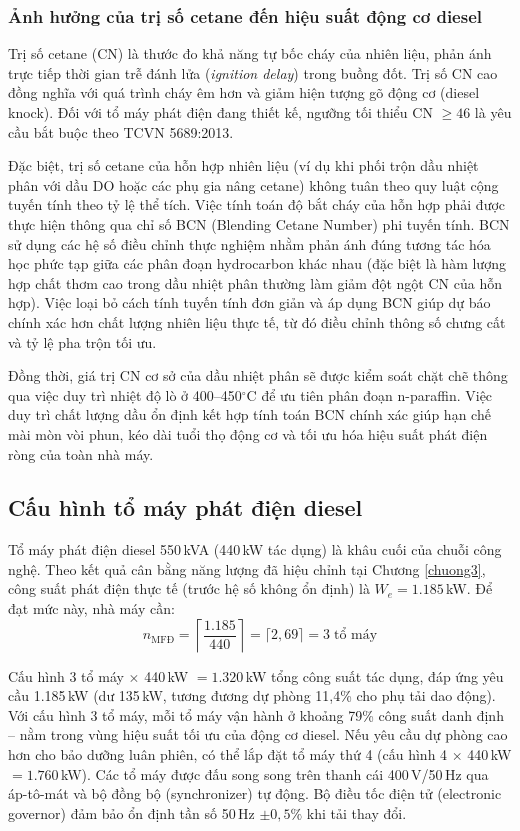 \documentclass[../main.tex]{subfiles}
\begin{document}
\subsubsection{Ảnh hưởng của trị số cetane đến hiệu suất động cơ diesel}
Trị số cetane (CN) là thước đo khả năng tự bốc cháy của nhiên liệu, phản ánh trực tiếp thời gian trễ đánh lửa (\emph{ignition delay}) trong buồng đốt. Trị số CN cao đồng nghĩa với quá trình cháy êm hơn và giảm hiện tượng gõ động cơ (diesel knock). Đối với tổ máy phát điện đang thiết kế, ngưỡng tối thiểu CN $\geq 46$ là yêu cầu bắt buộc theo TCVN 5689:2013.

Đặc biệt, trị số cetane của hỗn hợp nhiên liệu (ví dụ khi phối trộn dầu nhiệt phân với dầu DO hoặc các phụ gia nâng cetane) không tuân theo quy luật cộng tuyến tính theo tỷ lệ thể tích. Việc tính toán độ bắt cháy của hỗn hợp phải được thực hiện thông qua chỉ số BCN (Blending Cetane Number) phi tuyến tính. BCN sử dụng các hệ số điều chỉnh thực nghiệm nhằm phản ánh đúng tương tác hóa học phức tạp giữa các phân đoạn hydrocarbon khác nhau (đặc biệt là hàm lượng hợp chất thơm cao trong dầu nhiệt phân thường làm giảm đột ngột CN của hỗn hợp). Việc loại bỏ cách tính tuyến tính đơn giản và áp dụng BCN giúp dự báo chính xác hơn chất lượng nhiên liệu thực tế, từ đó điều chỉnh thông số chưng cất và tỷ lệ pha trộn tối ưu.

Đồng thời, giá trị CN cơ sở của dầu nhiệt phân sẽ được kiểm soát chặt chẽ thông qua việc duy trì nhiệt độ lò ở 400--450$^\circ\mathrm{C}$ để ưu tiên phân đoạn n-paraffin. Việc duy trì chất lượng dầu ổn định kết hợp tính toán BCN chính xác giúp hạn chế mài mòn vòi phun, kéo dài tuổi thọ động cơ và tối ưu hóa hiệu suất phát điện ròng của toàn nhà máy.

\subsection{Cấu hình tổ máy phát điện diesel}

Tổ máy phát điện diesel 550\,kVA (440\,kW tác dụng) là khâu cuối của chuỗi công nghệ. Theo kết quả cân bằng năng lượng đã hiệu chỉnh tại Chương \ref{chuong3}, công suất phát điện thực tế (trước hệ số không ổn định) là $W_e = 1.185$\,kW. Để đạt mức này, nhà máy cần:
\begin{equation}
  n_{\text{MFĐ}} = \left\lceil \frac{1.185}{440} \right\rceil = \lceil 2{,}69 \rceil = 3 \;\text{tổ máy}
\end{equation}

Cấu hình 3 tổ máy $\times$ 440\,kW $= 1.320$\,kW tổng công suất tác dụng, đáp ứng yêu cầu 1.185\,kW (dư 135\,kW, tương đương dự phòng 11,4\% cho phụ tải dao động). Với cấu hình 3 tổ máy, mỗi tổ máy vận hành ở khoảng 79\% công suất danh định -- nằm trong vùng hiệu suất tối ưu của động cơ diesel. Nếu yêu cầu dự phòng cao hơn cho bảo dưỡng luân phiên, có thể lắp đặt tổ máy thứ 4 (cấu hình 4 $\times$ 440\,kW $= 1.760$\,kW). Các tổ máy được đấu song song trên thanh cái 400\,V/50\,Hz qua áp-tô-mát và bộ đồng bộ (synchronizer) tự động. Bộ điều tốc điện tử (electronic governor) đảm bảo ổn định tần số 50\,Hz $\pm 0{,}5\%$ khi tải thay đổi.
\end{document}
